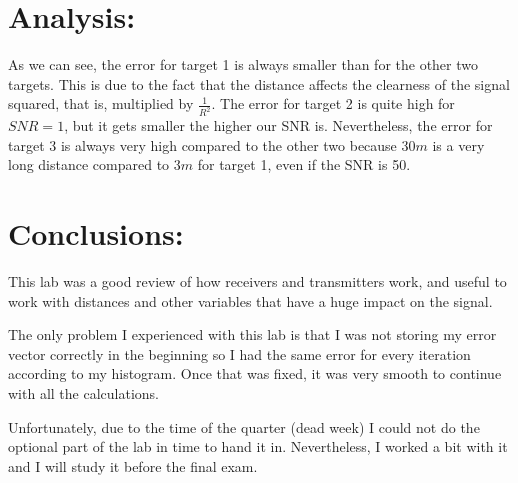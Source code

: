 \documentclass[a4paper,11pt]{article}
\begin{document}
\newpage

\section{Analysis:}

As we can see, the error for target 1 is always smaller than for the other two
targets. This is due to the fact that the distance affects the clearness of the
signal squared, that is, multiplied by $\displaystyle\frac{1}{R^2}$. The error
for target 2 is quite high for $SNR = 1$, but it gets smaller the higher our
SNR is. Nevertheless, the error for target 3 is always very high compared to
the other two because $30m$ is a very long distance compared to $3m$ for
target 1, even if the SNR is 50.

\section{Conclusions:}

This lab was a good review of how receivers and transmitters work, and useful to
work with distances and other variables that have a huge impact on the signal.

The only problem I experienced with this lab is that I was not storing my error
vector correctly in the beginning so I had the same error for every iteration
according to my histogram. Once that was fixed, it was very smooth to continue
with all the calculations.

Unfortunately, due to the time of the quarter (dead week) I could not do the
optional part of the lab in time to hand it in. Nevertheless, I worked a bit
with it and I will study it before the final exam.

\vspace{4cm}
\end{document}
